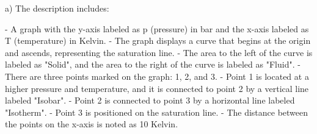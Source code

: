 a) The description includes:

- A graph with the y-axis labeled as p (pressure) in bar and the x-axis labeled as T (temperature) in Kelvin.
- The graph displays a curve that begins at the origin and ascends, representing the saturation line.
- The area to the left of the curve is labeled as "Solid", and the area to the right of the curve is labeled as "Fluid".
- There are three points marked on the graph: 1, 2, and 3.
- Point 1 is located at a higher pressure and temperature, and it is connected to point 2 by a vertical line labeled "Isobar".
- Point 2 is connected to point 3 by a horizontal line labeled "Isotherm".
- Point 3 is positioned on the saturation line.
- The distance between the points on the x-axis is noted as 10 Kelvin.